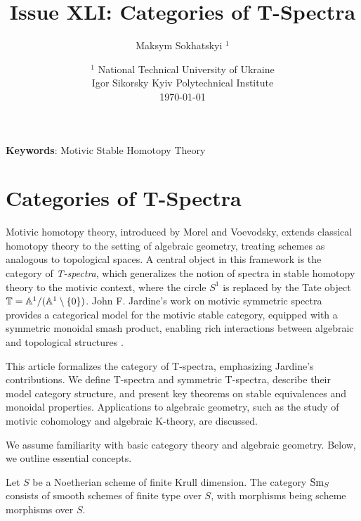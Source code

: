 \documentclass{article}
\begin{document}
\title{Issue XLI: Categories of T-Spectra}
\author{Maksym Sokhatskyi $^1$}
\date{ $^1$ National Technical University of Ukraine \\
       \small Igor Sikorsky Kyiv Polytechnical Institute \\
       \today }

\maketitle

\begin{abstract}
\end{abstract}

{\bf Keywords}: Motivic Stable Homotopy Theory

\ifincludeTOC
  \tableofcontents
\fi

\section{Categories of T-Spectra}

Motivic homotopy theory, introduced by Morel and Voevodsky, extends classical homotopy
theory to the setting of algebraic geometry, treating schemes as analogous to topological spaces.
A central object in this framework is the category of \emph{T-spectra}, which generalizes
the notion of spectra in stable homotopy theory to the motivic context, where
the circle \( S^1 \) is replaced by the Tate object \( \mathbb{T} = \mathbb{A}^1 / (\mathbb{A}^1 \setminus \{0\}) \).
John F. Jardine’s work on motivic symmetric spectra provides a categorical model for the
motivic stable category, equipped with a symmetric monoidal smash product, enabling rich
interactions between algebraic and topological structures \cite{Jardine2000MotivicSS}.

This article formalizes the category of T-spectra, emphasizing Jardine’s contributions.
We define T-spectra and symmetric T-spectra, describe their model category structure,
and present key theorems on stable equivalences and monoidal properties. Applications
to algebraic geometry, such as the study of motivic cohomology and algebraic K-theory, are discussed.

We assume familiarity with basic category theory and algebraic geometry. Below, we outline essential concepts.

\begin{definition}
Let \( S \) be a Noetherian scheme of finite Krull dimension. The category \( \text{Sm}_S \) consists of smooth schemes of finite type over \( S \), with morphisms being scheme morphisms over \( S \).
\end{definition}
\end{document}
